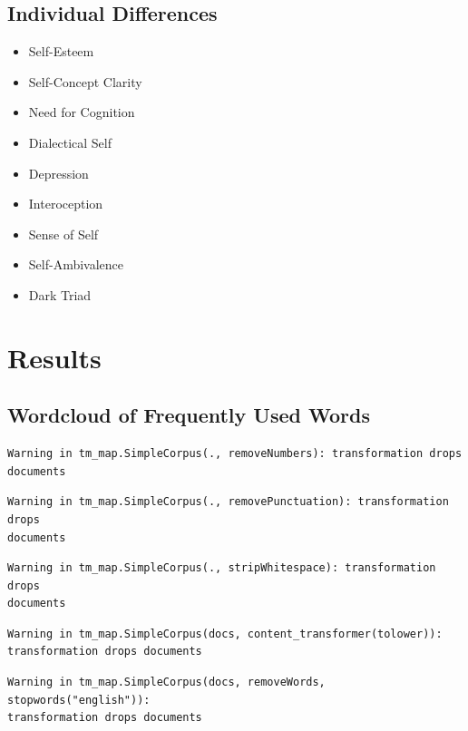 \documentclass[
  .7em,
  letterpaper,
  DIV=11,
  numbers=noendperiod]{scrartcl}
\providecommand{\tightlist}{%
  \setlength{\itemsep}{0pt}\setlength{\parskip}{0pt}}\usepackage{longtable,booktabs,array}
\begin{document}
\hypertarget{individual-differences}{%
\subsection{Individual Differences}\label{individual-differences}}

\begin{itemize}
\tightlist
\item
  Self-Esteem
\item
  Self-Concept Clarity
\item
  Need for Cognition
\item
  Dialectical Self
\item
  Depression
\item
  Interoception
\item
  Sense of Self
\item
  Self-Ambivalence
\item
  Dark Triad
\end{itemize}

\hypertarget{results}{%
\section{Results}\label{results}}

\hypertarget{wordcloud-of-frequently-used-words}{%
\subsection{Wordcloud of Frequently Used
Words}\label{wordcloud-of-frequently-used-words}}

\begin{verbatim}
Warning in tm_map.SimpleCorpus(., removeNumbers): transformation drops documents
\end{verbatim}

\begin{verbatim}
Warning in tm_map.SimpleCorpus(., removePunctuation): transformation drops
documents
\end{verbatim}

\begin{verbatim}
Warning in tm_map.SimpleCorpus(., stripWhitespace): transformation drops
documents
\end{verbatim}

\begin{verbatim}
Warning in tm_map.SimpleCorpus(docs, content_transformer(tolower)):
transformation drops documents
\end{verbatim}

\begin{verbatim}
Warning in tm_map.SimpleCorpus(docs, removeWords, stopwords("english")):
transformation drops documents
\end{verbatim}
\end{document}
